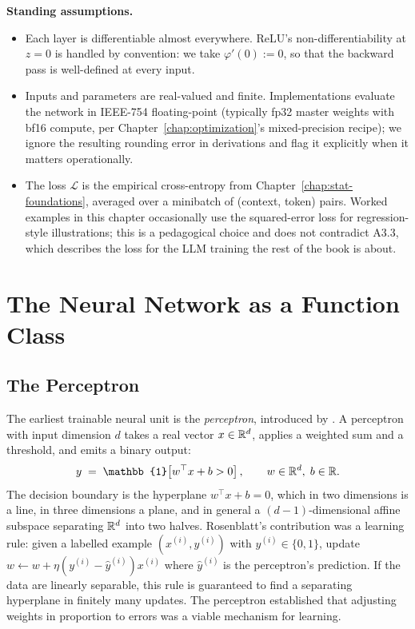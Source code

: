 \begin{notationbox}
\textbf{Standing assumptions.}
\begin{itemize}
  \item[A3.1] Each layer is differentiable almost everywhere.
        ReLU's non-differentiability at $z = 0$ is handled by
        convention: we take $\varphi'(0) := 0$, so that the
        backward pass is well-defined at every input.
  \item[A3.2] Inputs and parameters are real-valued and finite.
        Implementations evaluate the network in IEEE-754
        floating-point (typically fp32 master weights with bf16
        compute, per Chapter~\ref{chap:optimization}'s mixed-precision recipe); we
        ignore the resulting rounding error in derivations and
        flag it explicitly when it matters operationally.
  \item[A3.3] The loss $\mathcal{L}$ is the empirical
        cross-entropy from Chapter~\ref{chap:stat-foundations}, averaged over a minibatch
        of (context, token) pairs. Worked examples in this
        chapter occasionally use the squared-error loss for
        regression-style illustrations; this is a pedagogical
        choice and does not contradict A3.3, which describes the
        loss for the LLM training the rest of the book is about.
\end{itemize}
\end{notationbox}


\section{The Neural Network as a Function Class}
\label{sec:nn-function-class}

\subsection{The Perceptron}

The earliest trainable neural unit is the \emph{perceptron},
introduced by \citet{rosenblatt1958perceptron}. A perceptron with
input dimension $d$ takes a real vector $x \in \mathbb{R}^d$, applies a
weighted sum and a threshold, and emits a binary output:
\begin{equation}
  y \;=\; \mathbb{1}\!\left[ w^\top x + b > 0 \right],
  \qquad w \in \R^d,\; b \in \R.
  \label{eq:nn-perceptron}
\end{equation}
The decision boundary is the hyperplane $w^\top x + b = 0$, which
in two dimensions is a line, in three dimensions a plane, and in
general a $(d-1)$-dimensional affine subspace separating $\mathbb{R}^d$
into two halves. Rosenblatt's contribution was a learning rule:
given a labelled example $(x^{(i)}, y^{(i)})$ with $y^{(i)} \in
\{0, 1\}$, update $w \leftarrow w + \eta (y^{(i)} - \hat{y}^{(i)})
x^{(i)}$ where $\hat{y}^{(i)}$ is the perceptron's prediction. If
the data are linearly separable, this rule is guaranteed to find a
separating hyperplane in finitely many updates. The perceptron
established that adjusting weights in proportion to errors was a
viable mechanism for learning.


